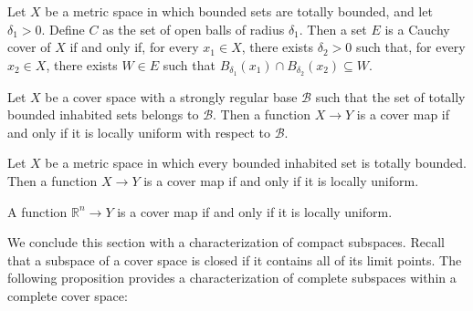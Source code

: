 \documentclass[pdflatex,sn-mathphys-num]{sn-jnl}
\theoremstyle{definition}
\theoremstyle{remark}
\numberwithin{figure}{section}
\begin{document}
\begin{example}
Let $X$ be a metric space in which bounded sets are totally bounded, and let $\delta_1 > 0$.
Define $C$ as the set of open balls of radius $\delta_1$.
Then a set $E$ is a Cauchy cover of $X$ if and only if, for every $x_1 \in X$, there exists $\delta_2 > 0$ such that, for every $x_2 \in X$,
there exists $W \in E$ such that $B_{\delta_1}(x_1) \cap B_{\delta_2}(x_2) \subseteq W$.
\end{example}

\begin{cor}
Let $X$ be a cover space with a strongly regular base $\mathcal{B}$ such that the set of totally bounded inhabited sets belongs to $\mathcal{B}$.
Then a function $X \to Y$ is a cover map if and only if it is locally uniform with respect to $\mathcal{B}$.
\end{cor}

\begin{cor}
Let $X$ be a metric space in which every bounded inhabited set is totally bounded.
Then a function $X \to Y$ is a cover map if and only if it is locally uniform.
\end{cor}

\begin{cor}
A function $\mathbb{R}^n \to Y$ is a cover map if and only if it is locally uniform.
\end{cor}

We conclude this section with a characterization of compact subspaces.
Recall that a subspace of a cover space is closed if it contains all of its limit points.
The following proposition provides a characterization of complete subspaces within a complete cover space:
\end{document}
